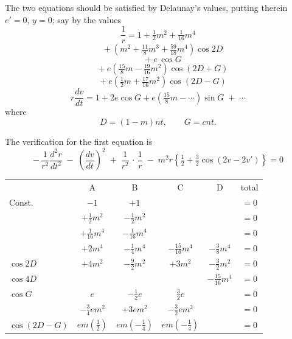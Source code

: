 \documentclass[11pt,a4paper]{article}
\begin{document}
The two equations should be satisfied by Delaunay's values, putting therein $e' = 0$, $y = 0$; say by the values
\[
\frac{1}{r} = 1 + \tfrac{1}{2} m^2 + \tfrac{1}{16} m^4
\]
\[
\quad + \left(m^2 + \tfrac{11}{8} m^3 + \tfrac{59}{18} m^4\right)\cos 2D
\]
\[
\quad + e\,\cos G
\]
\[
\quad + e\!\left(\tfrac{15}{8} m - \tfrac{19}{16}m^2\right)\cos(2D + G)
\]
\[
\quad + e\!\left(\tfrac{1}{2}m + \tfrac{17}{16}m^2\right)\cos(2D - G)
\]
\[
r\frac{dv}{dt} = 1 + 2e\cos G + e\!\left(\tfrac{15}{8} m - \cdots\right)\sin G \;+\;\cdots
\]
where
\[
D = (1 - m) n t, \qquad G = c n t.
\]

The verification for the first equation is
\[
-\,\frac{1}{r^2}\frac{d^2 r}{dt^2} \;-\; \left(\frac{dv}{dt}\right)^{\!2}\;+\;\frac{1}{r^2}\,\cdot\,\frac{1}{r}\;-\;m^2 r\!\left\{\tfrac{1}{2} + \tfrac{3}{2}\cos(2v - 2v')\right\} = 0
\]
\begin{center}
\small
\begin{tabular}{lccccc}
& A & B & C & D & total \\
Const.        & $-1$           & $+1$           &     &                 & $=0$ \\
              & $+\tfrac{1}{2}m^2$ & $-\tfrac{1}{2}m^2$ & & & $=0$ \\
              & $+\tfrac{1}{16}m^4$ & $-\tfrac{1}{16}m^4$ & & & $=0$ \\
              & $+2 m^4$       & $-\tfrac{1}{4}m^4$ & $-\tfrac{15}{16}m^4$ & $-\tfrac{3}{8}m^4$ & $=0$ \\
$\cos 2D$     & $+4 m^2$       & $-\tfrac{9}{2}m^2$ & $+3 m^2$ & $-\tfrac{3}{2}m^2$ & $=0$ \\
$\cos 4D$     &                &                  &          & $-\tfrac{15}{16}m^4$ & $=0$ \\
$\cos G$      & $e$            & $-\tfrac{1}{2}e$ & $\tfrac{3}{2}e$ &           & $=0$ \\
              & $-\tfrac{3}{4} e m^2$ & $+3 e m^2$ & $-\tfrac{3}{2} e m^2$ &      & $=0$ \\
$\cos(2D - G)$ & $e m\!\left(\tfrac{1}{2}\right)$ & $e m\!\left(-\tfrac{1}{4}\right)$ & $e m\!\left(-\tfrac{1}{4}\right)$ & & $=0$ \\
\end{tabular}
\end{center}
\end{document}
